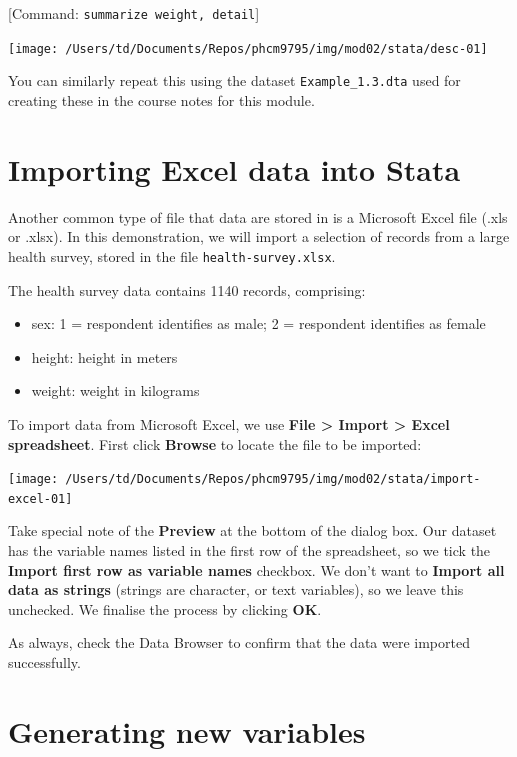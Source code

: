 \documentclass[
]{memoir}
\providecommand{\tightlist}{%
  \setlength{\itemsep}{0pt}\setlength{\parskip}{0pt}}
\begin{document}
{[}Command: \texttt{summarize\ weight,\ detail}{]}

\texttt{[image: /Users/td/Documents/Repos/phcm9795/img/mod02/stata/desc-01]}

You can similarly repeat this using the dataset \texttt{Example\_1.3.dta} used for creating these in the course notes for this module.

\hypertarget{importing-excel-data-into-stata}{%
\section{Importing Excel data into Stata}\label{importing-excel-data-into-stata}}

Another common type of file that data are stored in is a Microsoft Excel file (.xls or .xlsx). In this demonstration, we will import a selection of records from a large health survey, stored in the file \texttt{health-survey.xlsx}.

The health survey data contains 1140 records, comprising:

\begin{itemize}
\tightlist
\item
  sex: 1 = respondent identifies as male; 2 = respondent identifies as female
\item
  height: height in meters
\item
  weight: weight in kilograms
\end{itemize}

To import data from Microsoft Excel, we use \textbf{File \textgreater{} Import \textgreater{} Excel spreadsheet}. First click \textbf{Browse} to locate the file to be imported:

\texttt{[image: /Users/td/Documents/Repos/phcm9795/img/mod02/stata/import-excel-01]}

Take special note of the \textbf{Preview} at the bottom of the dialog box. Our dataset has the variable names listed in the first row of the spreadsheet, so we tick the \textbf{Import first row as variable names} checkbox. We don't want to \textbf{Import all data as strings} (strings are character, or text variables), so we leave this unchecked. We finalise the process by clicking \textbf{OK}.

As always, check the Data Browser to confirm that the data were imported successfully.

\hypertarget{generating-new-variables}{%
\section{Generating new variables}\label{generating-new-variables}}
\end{document}
